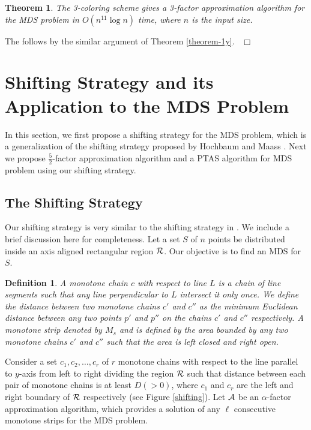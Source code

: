 \documentclass[a4paper,11pt]{article}
\newtheorem{theorem}{Theorem}
\newtheorem{definition}{Definition}
\newenvironment{proof}{\noindent {\bf Proof:\,\ }}{\hfill\mbox{\
$\Box$}\smallskip}
\begin{document}
\begin{theorem} \label{theorem-2y}
 The 3-coloring scheme gives a 3-factor approximation algorithm for the MDS problem in 
 $O(n^{11} \log n)$ time, where $n$ is the input size.
\end{theorem}

\begin{proof}
The follows by the similar argument of Theorem \ref{theorem-1y}.   
\end{proof}

\section{Shifting Strategy and its Application to the MDS Problem} \label{ShiftingStrategy}
In this section, we first propose a shifting strategy for the MDS problem, which is 
a generalization of the shifting strategy proposed by Hochbaum and Maass \cite{HM85}. Next we propose 
$\frac{5}{2}$-factor approximation algorithm and a PTAS algorithm for MDS problem using our shifting strategy.  

\subsection{The Shifting Strategy} \label{shifting-strategy}
Our shifting strategy is very similar to the shifting strategy in \cite{HM85}. We include a brief 
discussion here for completeness. Let a set $S$ of $n$ points be distributed inside an axis aligned 
rectangular region ${\cal R}$. Our objective is to find an MDS for $S$. 

\begin{definition}
A {\it monotone chain} $c$ with respect to line $L$ is a chain of line segments 
such that any line perpendicular to $L$ intersect it only once. We define the distance between two 
monotone chains $c'$ and $c''$ as the minimum Euclidean distance between any two points $p'$ and $p''$ 
on the chains $c'$ and $c''$ respectively. A {\it monotone strip} denoted by $M_s$ and is defined by the 
area bounded by any two monotone chains $c'$ and $c''$ such that the area is left closed and 
right open.
\end{definition}

Consider a set $c_1, c_2, \ldots, c_r$ of $r$ monotone chains with respect to the line parallel to $y$-axis 
from left to right dividing the region ${\cal R}$ such that distance between each pair of monotone chains is 
at least $D (>0)$, where $c_1$ and $c_r$ are the left and right boundary of ${\cal R}$ respectively 
(see Figure \ref{shifting}). Let ${\cal A}$ be an $\alpha$-factor approximation algorithm, which provides a 
solution of any $\ell$ consecutive monotone strips for the MDS problem. 
\end{document}
